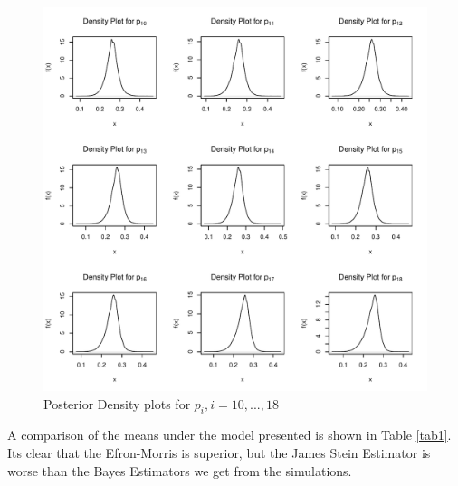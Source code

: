 \documentclass[12pt, leqno]{article}
\begin{document}
\begin{figure}
\begin{center}
  \includegraphics[scale=0.8]{pdensity2.pdf}
\end{center}
\caption{Posterior Density plots for $p_i, i = 10, ..., 18$} 
\label{dens2}
\end{figure}  
A comparison of the means under the model presented is shown in Table
\ref{tab1}. Its clear that the Efron-Morris is superior, but the James
Stein Estimator is worse than the Bayes Estimators we get from the simulations. 
\end{document}
